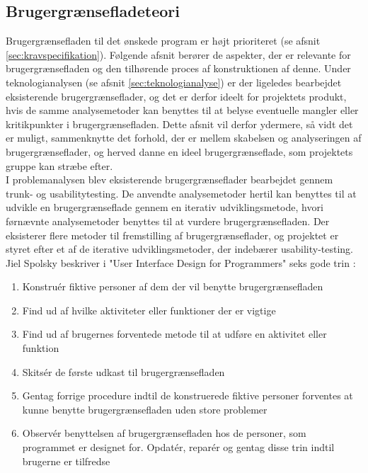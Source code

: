 \subsection{Brugergrænsefladeteori}
\label{sec:teoribrugerdesign}

Brugergrænsefladen til det ønskede program er højt prioriteret (se afsnit \ref{sec:kravspecifikation}). Følgende afsnit berører de aspekter, der er relevante for brugergrænsefladen og den tilhørende proces af konstruktionen af denne. Under teknologianalysen (se afsnit \ref{sec:teknologianalyse}) er der ligeledes bearbejdet eksisterende brugergrænseflader, og det er derfor ideelt for projektets produkt, hvis de samme analysemetoder kan benyttes til at belyse eventuelle mangler eller kritikpunkter i brugergrænsefladen. Dette afsnit vil derfor ydermere, så vidt det er muligt, sammenknytte det forhold, der er mellem skabelsen og analyseringen af brugergrænseflader, og herved danne en ideel brugergrænseflade, som projektets gruppe kan stræbe efter.\\

I problemanalysen blev eksisterende brugergrænseflader bearbejdet gennem trunk- og usabilitytesting. De anvendte analysemetoder hertil kan benyttes til at udvikle en brugergrænseflade gennem en iterativ udviklingsmetode, hvori førnævnte analysemetoder benyttes til at vurdere brugergrænsefladen. Der eksisterer flere metoder til fremstilling af brugergrænseflader, og projektet er styret efter et af de iterative udviklingsmetoder, der indebærer usability-testing. Jiel Spolsky beskriver i "User Interface Design for Programmers" seks gode trin \cite{Joel_ui_design} :

\begin{enumerate}
	\item Konstruér fiktive personer af dem der vil benytte brugergrænsefladen
	\item Find ud af hvilke aktiviteter eller funktioner der er vigtige
	\item Find ud af brugernes forventede metode til at udføre en aktivitet eller funktion
	\item Skitsér de første udkast til brugergrænsefladen
	\item Gentag forrige procedure indtil de konstruerede fiktive personer forventes at kunne benytte brugergrænsefladen uden store problemer
	\item Observér benyttelsen af brugergrænsefladen hos de personer, som programmet er designet for. Opdatér, reparér og gentag disse trin indtil brugerne er tilfredse
\end{enumerate}

